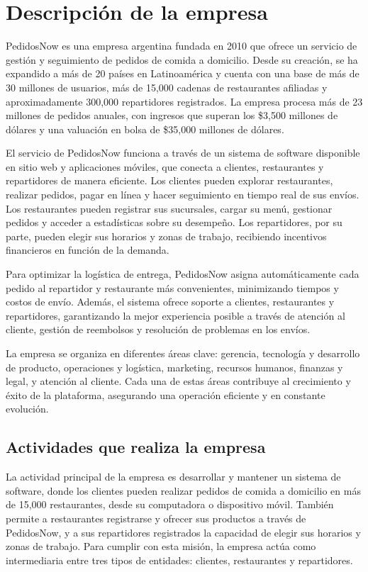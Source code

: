 
\section{Descripción de la empresa}

PedidosNow es una empresa argentina fundada en 2010 que ofrece un servicio de gestión y seguimiento de pedidos de comida a domicilio. Desde su creación, se ha expandido a más de 20 países en Latinoamérica y cuenta con una base de más de 30 millones de usuarios, más de 15,000 cadenas de restaurantes afiliadas y aproximadamente 300,000 repartidores registrados. La empresa procesa más de 23 millones de pedidos anuales, con ingresos que superan los \$3,500 millones de dólares y una valuación en bolsa de \$35,000 millones de dólares.

El servicio de PedidosNow funciona a través de un sistema de software disponible en sitio web y aplicaciones móviles, que conecta a clientes, restaurantes y repartidores de manera eficiente. Los clientes pueden explorar restaurantes, realizar pedidos, pagar en línea y hacer seguimiento en tiempo real de sus envíos. Los restaurantes pueden registrar sus sucursales, cargar su menú, gestionar pedidos y acceder a estadísticas sobre su desempeño. Los repartidores, por su parte, pueden elegir sus horarios y zonas de trabajo, recibiendo incentivos financieros en función de la demanda.

Para optimizar la logística de entrega, PedidosNow asigna automáticamente cada pedido al repartidor y restaurante más convenientes, minimizando tiempos y costos de envío. Además, el sistema ofrece soporte a clientes, restaurantes y repartidores, garantizando la mejor experiencia posible a través de atención al cliente, gestión de reembolsos y resolución de problemas en los envíos.

La empresa se organiza en diferentes áreas clave: gerencia, tecnología y desarrollo de producto, operaciones y logística, marketing, recursos humanos, finanzas y legal, y atención al cliente. Cada una de estas áreas contribuye al crecimiento y éxito de la plataforma, asegurando una operación eficiente y en constante evolución.

\subsection{Actividades que realiza la empresa}

La actividad principal de la empresa es desarrollar y mantener un sistema de software, donde los clientes pueden realizar pedidos de comida a domicilio en más de 15,000 restaurantes, desde su computadora o dispositivo móvil. También permite a restaurantes registrarse y ofrecer sus productos a través de PedidosNow, y a sus repartidores registrados la capacidad de elegir sus horarios y zonas de trabajo. Para cumplir con esta misión, la empresa actúa como intermediaria entre tres tipos de entidades: clientes, restaurantes y repartidores.

